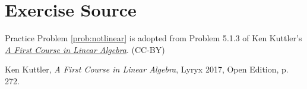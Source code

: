 \documentclass{ximera}
\begin{document}
\section*{Exercise Source}
Practice Problem \ref{prob:notlinear} is adopted from Problem 5.1.3 of Ken Kuttler's \href{https://open.umn.edu/opentextbooks/textbooks/a-first-course-in-linear-algebra-2017}{\it A First Course in Linear Algebra}. (CC-BY)

Ken Kuttler, {\it  A First Course in Linear Algebra}, Lyryx 2017, Open Edition, p. 272.
\end{document}
